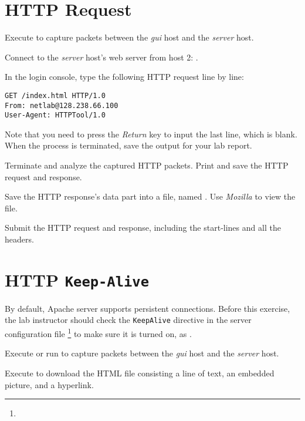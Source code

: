 \documentclass{../UTNetLab}
\begin{document}
\section{HTTP Request}
Execute  to capture packets between the \textit{gui} host and the \textit{server} host.

Connect to the \textit{server} host’s web server from host 2: .

In the login console, type the following HTTP request line by line:
\begin{lstlisting}[language={HTTP},morekeywords={[2]GET,From,User-Agent},escapechar={},emph={server,netlab}]
GET /index.html HTTP/1.0
From: netlab@128.238.66.100
User-Agent: HTTPTool/1.0

    \end{lstlisting}
Note that you need to press the \textit{Return} key to input the last line, which is blank.
When the  process is terminated, save the output for your lab report.

Terminate  and analyze the captured HTTP packets.
Print and save the HTTP request and response.

Save the HTTP response’s data part into a file, named .
Use \textit{Mozilla} to view the file.

\begin{report}
    \item Submit the HTTP request and response, including the start-lines and all the headers.
\end{report}


\section{HTTP \texttt{Keep-Alive}}
By default, Apache server supports persistent connections.
Before this exercise, the lab instructor should check the \texttt{KeepAlive} directive in the server configuration file \footnote{} to make sure it is turned on, as .

Execute  or run  to capture packets between the \textit{gui} host and the \textit{server} host.


Execute   to download the HTML file consisting a line of text, an embedded picture, and a hyperlink.
\end{document}
